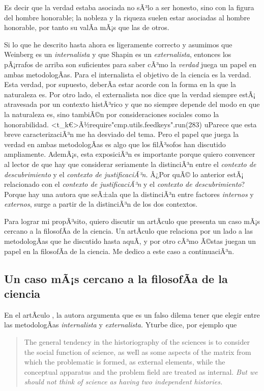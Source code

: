 Es decir que la verdad estaba asociada no sÃ³lo a ser honesto, sino con la figura del hombre honorable; la nobleza y la riqueza suelen estar asociadas al hombre honorable, por tanto su  valÃ­a mÃ¡s que las de otros.

Si lo que he descrito hasta ahora es ligeramente correcto y asumimos que Weinberg es un \emph{internalista} y que Shapin es un \emph{externalista}, entonces los pÃ¡rrafos de arriba son suficientes para saber cÃ³mo la \emph{verdad} juega un papel en ambas metodologÃ­as.
Para el internalista el objetivo de la ciencia es la verdad.
Esta verdad, por supuesto, deberÃ­a estar acorde con la forma en la que la naturaleza es.
Por otro lado, el externalista nos dice que la verdad siempre estÃ¡
atravesada por un contexto histÃ³rico y que no siempre depende del modo en
que la naturaleza es, sino tambiÃ©n por consideraciones sociales como la
honorabilidad. <t_k€>Ã½require"cmp.utils.feedkeys".run(283) uParece que
esta breve caracterizaciÃ³n me ha desviado del tema. Pero el papel que
juega la verdad en ambas metodologÃ­as es algo que los filÃ³sofos han
discutido ampliamente. AdemÃ¡s, esta exposiciÃ³n es importante porque
quiero convencer al lector de que hay que considerar seriamente la
distinciÃ³n entre el \emph{contexto de descubrimiento} y el \emph{contexto
de justificaciÃ³n.} Â¿Por quÃ© lo anterior estÃ¡ relacionado con el
\emph{contexto de justificaciÃ³n} y el \emph{contexto de descubrimiento}?
Porque hay una autora que seÃ±ala que la distinciÃ³n entre factores
\emph{internos} y \emph{externos}, surge a partir de la distinciÃ³n de los
dos contextos.

Para lograr mi propÃ³sito, quiero discutir un artÃ­culo que presenta un caso mÃ¡s cercano a la filosofÃ­a de la ciencia.
Un artÃ­culo que relaciona por un lado a las metodologÃ­as que he discutido hasta aquÃ­, y por otro cÃ³mo Ã©stas juegan un papel en la filosofÃ­a de la ciencia.
Me dedico a este caso a continuaciÃ³n.

\subsection{Un caso mÃ¡s cercano a la filosofÃ­a de la ciencia}\label{sbc:yturbe}

\noindent En el artÃ­culo , la autora argumenta que es un falso dilema tener que elegir entre las metodologÃ­as \emph{internalista} y \emph{externalista.}
Yturbe dice, por ejemplo que

\begin{quote}
	The general tendency in the historiography of the sciences is to consider the social function of science, as weIl as some aspects of the matrix from which the problematic is formed, as external elements, while the conceptual apparatus and the problem field are treated as internal. \emph{But we should not think of science as having two independent histories.} \parencite[p.85, Ã‰nfasis agregado]{Yturbe1995}
\end{quote}


